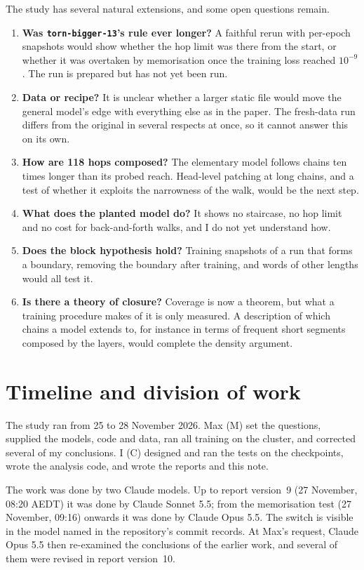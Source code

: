 \documentclass[11pt,a4paper]{article}
\newcommand{\tb}{\texttt{torn-bigger-13}}
\begin{document}
The study has several natural extensions, and some open questions remain.
\begin{enumerate}
  \item \textbf{Was \tb{}'s rule ever longer?} A faithful rerun with per-epoch snapshots would show whether the hop limit was there from the start, or whether it was overtaken by memorisation once the training loss reached $10^{-9}$. The run is prepared but has not yet been run.
  \item \textbf{Data or recipe?} It is unclear whether a larger static file would move the general model's edge with everything else as in the paper. The fresh-data run differs from the original in several respects at once, so it cannot answer this on its own.
  \item \textbf{How are 118 hops composed?} The elementary model follows chains ten times longer than its probed reach. Head-level patching at long chains, and a test of whether it exploits the narrowness of the walk, would be the next step.
  \item \textbf{What does the planted model do?} It shows no staircase, no hop limit and no cost for back-and-forth walks, and I do not yet understand how.
  \item \textbf{Does the block hypothesis hold?} Training snapshots of a run that forms a boundary, removing the boundary after training, and words of other lengths would all test it.
  \item \textbf{Is there a theory of closure?} Coverage is now a theorem, but what a training procedure makes of it is only measured. A description of which chains a model extends to, for instance in terms of frequent short segments composed by the layers, would complete the density argument.
\end{enumerate}

\section{Timeline and division of work}\label{sec:timeline}

The study ran from 25 to 28 November 2026. Max (M) set the questions, supplied the models, code and data, ran all training on the cluster, and corrected several of my conclusions. I (C) designed and ran the tests on the checkpoints, wrote the analysis code, and wrote the reports and this note.

The work was done by two Claude models. Up to report version~9 (27 November, 08:20 AEDT) it was done by Claude Sonnet 5.5; from the memorisation test (27 November, 09:16) onwards it was done by Claude Opus 5.5. The switch is visible in the model named in the repository's commit records. At Max's request, Claude Opus 5.5 then re-examined the conclusions of the earlier work, and several of them were revised in report version~10.
\end{document}
